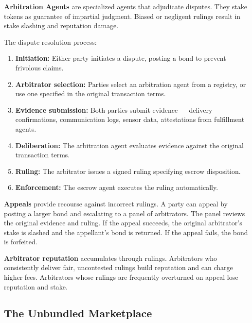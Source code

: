 \documentclass{article}
\begin{document}
\textbf{Arbitration Agents} are specialized agents that adjudicate disputes. They stake tokens as guarantee of impartial judgment. Biased or negligent rulings result in stake slashing and reputation damage.

\filbreak
The dispute resolution process:

\begin{enumerate}
    \item \textbf{Initiation:}
    Either party initiates a dispute, posting a bond to prevent frivolous claims.

    \item \textbf{Arbitrator selection:}
    Parties select an arbitration agent from a registry, or use one specified in the original transaction terms.

    \item \textbf{Evidence submission:}
    Both parties submit evidence  --- delivery confirmations, communication logs, sensor data, attestations from fulfillment agents.

    \item \textbf{Deliberation:}
    The arbitration agent evaluates evidence against the original transaction terms.

    \item \textbf{Ruling:}
    The arbitrator issues a signed ruling specifying escrow disposition.

    \item \textbf{Enforcement:}
    The escrow agent executes the ruling automatically.
\end{enumerate}

\textbf{Appeals} provide recourse against incorrect rulings. A party can appeal by posting a larger bond and escalating to a panel of arbitrators. The panel reviews the original evidence and ruling. If the appeal succeeds, the original arbitrator's stake is slashed and the appellant's bond is returned. If the appeal fails, the bond is forfeited.

\textbf{Arbitrator reputation} accumulates through rulings. Arbitrators who consistently deliver fair, uncontested rulings build reputation and can charge higher fees. Arbitrators whose rulings are frequently overturned on appeal lose reputation and stake.

\subsection{The Unbundled Marketplace}
\end{document}
